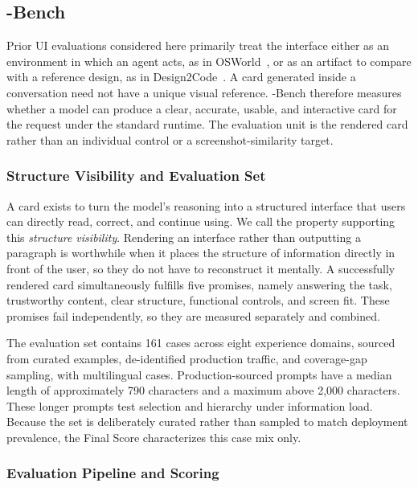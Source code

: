 \subsection{\uifora{}-Bench}
\label{sec:ui4abench}

Prior UI evaluations considered here primarily treat the interface either as an environment in which an agent acts, as in OSWorld~\citep{xie2024}, or as an artifact to compare with a reference design, as in Design2Code~\citep{si2025design2code}. A card generated inside a conversation need not have a unique visual reference. \uifora{}-Bench therefore measures whether a model can produce a clear, accurate, usable, and interactive card for the request under the standard \uifora{} runtime. The evaluation unit is the rendered card rather than an individual control or a screenshot-similarity target.

\subsubsection{Structure Visibility and Evaluation Set}
\label{sec:ui4a_visibility}

A card exists to turn the model's reasoning into a structured interface that users can directly read, correct, and continue using. We call the property supporting this \emph{structure visibility}. Rendering an interface rather than outputting a paragraph is worthwhile when it places the structure of information directly in front of the user, so they do not have to reconstruct it mentally. A successfully rendered card simultaneously fulfills five promises, namely answering the task, trustworthy content, clear structure, functional controls, and screen fit. These promises fail independently, so they are measured separately and combined.

The evaluation set contains 161 cases across eight experience domains, sourced from curated examples, de-identified production traffic, and coverage-gap sampling, with multilingual cases. Production-sourced prompts have a median length of approximately 790 characters and a maximum above 2{,}000 characters. These longer prompts test selection and hierarchy under information load. Because the set is deliberately curated rather than sampled to match deployment prevalence, the Final Score characterizes this case mix only.

\subsubsection{Evaluation Pipeline and Scoring}
\label{sec:ui4a_pipeline}

